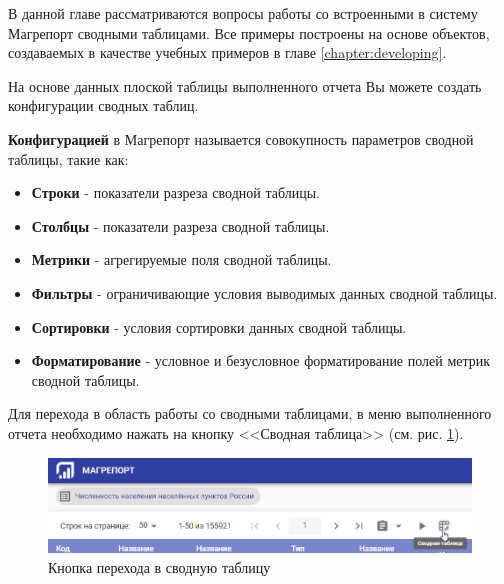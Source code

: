 \documentclass[../user-manual.tex]{subfiles}
\begin{document}
	В данной главе рассматриваются вопросы работы со встроенными в систему Магрепорт сводными таблицами. Все примеры построены на основе объектов, создаваемых в качестве учебных примеров в главе \ref{chapter:developing}.
	
	На основе данных плоской таблицы выполненного отчета Вы можете создать конфигурации сводных таблиц.
	
		\begin{concept}
		\textbf{Конфигурацией} в Магрепорт называется совокупность параметров сводной таблицы, такие как:
		
			\begin{itemize}
				\item \textbf{Строки} - показатели разреза сводной таблицы.
				
				\item \textbf{Столбцы} - показатели разреза сводной таблицы.
						
				\item \textbf{Метрики} - агрегируемые поля сводной таблицы.
			
				\item \textbf{Фильтры} - ограничивающие условия выводимых данных сводной таблицы.
			
				\item \textbf{Сортировки} - условия сортировки данных сводной таблицы.
			
				\item \textbf{Форматирование} - условное и безусловное форматирование полей метрик сводной таблицы.
			\end{itemize}
		\end{concept}
	
	Для перехода в область работы со сводными таблицами, в меню выполненного отчета необходимо нажать на кнопку <<Сводная таблица>> (см. рис. \ref{fig:open-pivot-button}).
	
	\begin{figure}[h]
		\centering
		\includegraphics[width=\graphicswidth]{img/1-open-pivot-button.png}
		\caption{Кнопка перехода в сводную таблицу}
		\label{fig:open-pivot-button}
	\end{figure}	
	
\end{document}
